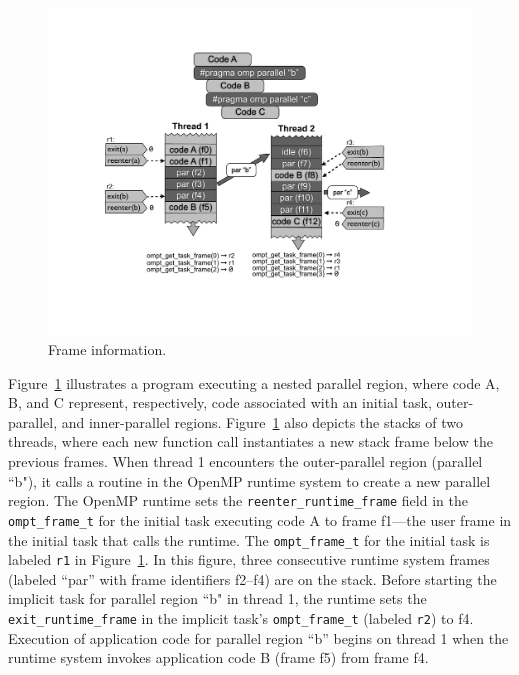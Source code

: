 \documentclass{article}
\begin{document}
{   \begin{figure}[h]
    \centering
        \includegraphics[scale=0.55]{callstack-cropped.pdf}
    \caption{Frame information.}
    \label{fig:frame}
\end{figure}

\noindent
Figure~\ref{fig:frame} illustrates a program executing a nested parallel region, where code A, B, and C represent, respectively, code associated with an initial task, outer-parallel, and inner-parallel regions.  Figure~\ref{fig:frame}  also depicts the stacks of two threads, where each new function call instantiates a new stack frame below the previous frames. When thread 1 encounters the outer-parallel region (parallel ``b"), it calls a routine in the OpenMP runtime system to create a new parallel region. The OpenMP runtime sets the \verb|reenter_runtime_frame| field in the \verb|ompt_frame_t| for the initial task executing code A to  frame f1---the user frame in the initial task that calls the runtime. The  \verb|ompt_frame_t| for the initial task is labeled  \verb|r1| in Figure~\ref{fig:frame}. In this figure, three consecutive runtime system frames (labeled ``par'' with frame identifiers f2--f4) are on the stack. 
Before starting the implicit task for parallel region ``b" in thread 1, the runtime sets the \verb|exit_runtime_frame| in the implicit task's \verb|ompt_frame_t|  (labeled \verb|r2|) to f4. Execution of application code for parallel region ``b''  begins on thread 1  when the runtime system invokes application code B (frame f5) from frame f4. 

}
\end{document}
